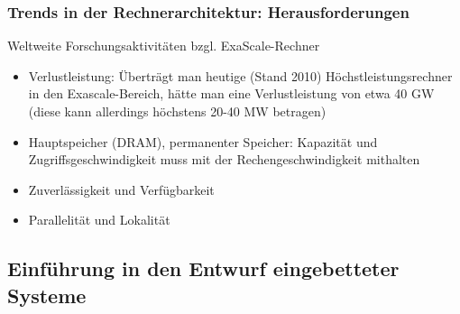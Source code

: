 \subsubsection{Trends in der Rechnerarchitektur: Herausforderungen}
Weltweite Forschungsaktivitäten bzgl. ExaScale-Rechner
\begin{itemize}
	\item Verlustleistung: Überträgt man heutige (Stand 2010) Höchstleistungsrechner in den Exascale-Bereich, hätte man eine Verlustleistung von etwa 40 GW (diese kann allerdings höchstens 20-40 MW betragen)
	\item Hauptspeicher (DRAM), permanenter Speicher: Kapazität und Zugriffsgeschwindigkeit muss mit der Rechengeschwindigkeit mithalten
	\item Zuverlässigkeit und Verfügbarkeit
	\item Parallelität und Lokalität
\end{itemize}


\subsection{Einführung in den Entwurf eingebetteter Systeme}

